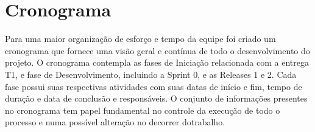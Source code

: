 \section{Cronograma}

	Para uma maior organização de esforço e tempo da equipe foi criado um cronograma que fornece uma visão geral e contínua de todo o desenvolvimento do projeto.  O cronograma contempla as fases de Iniciação relacionada com a entrega T1, e fase de Desenvolvimento, incluindo a Sprint 0, e as Releases 1 e 2. Cada fase possui suas respectivas atividades com suas datas de início e fim, tempo de duração e data de conclusão e responsáveis. O conjunto de informações presentes no cronograma tem papel fundamental no controle da execução de todo o processo e numa possível alteração no decorrer dotrabalho.
 
	
